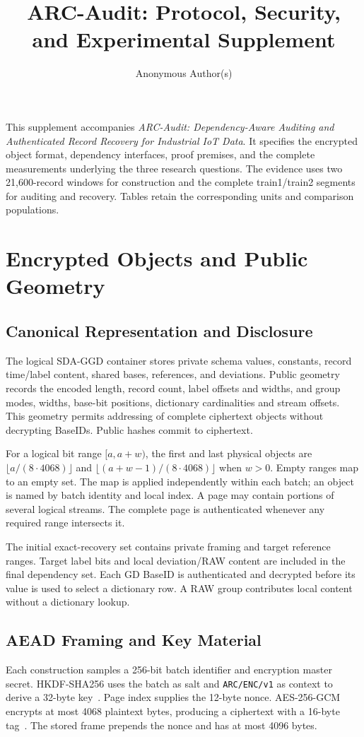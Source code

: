 \documentclass[10pt,journal,onecolumn]{IEEEtran}
\title{ARC-Audit: Protocol, Security, and Experimental Supplement}
\author{Anonymous Author(s)}
\begin{document}
\maketitle
This supplement accompanies \emph{ARC-Audit: Dependency-Aware Auditing
and Authenticated Record Recovery for Industrial IoT Data}. It specifies
the encrypted object format, dependency interfaces, proof premises, and the
complete measurements underlying the three research questions. The evidence
uses two 21,600-record windows for construction and the complete train1/train2
segments for auditing and recovery. Tables retain the corresponding units
and comparison populations.

\section{Encrypted Objects and Public Geometry}\label{sec:protocol}
\subsection{Canonical Representation and Disclosure}
The logical SDA-GGD container stores private schema values, constants,
record time/label content, shared bases, references, and deviations. Public
geometry records the encoded length, record count, label offsets and widths,
and group modes, widths, base-bit positions, dictionary cardinalities and
stream offsets. This geometry permits addressing of complete ciphertext
objects without decrypting BaseIDs. Public hashes commit to ciphertext.

For a logical bit range $[a,a+w)$, the first and last physical objects are
$\lfloor a/(8\cdot4068)\rfloor$ and
$\lfloor(a+w-1)/(8\cdot4068)\rfloor$ when $w>0$. Empty ranges map to an empty
set. The map is applied independently within each batch; an object is named
by batch identity and local index. A page may contain portions of several
logical streams. The complete page is authenticated whenever any required
range intersects it.

The initial exact-recovery set contains private framing and target reference
ranges. Target label bits and local deviation/RAW content are included in
the final dependency set. Each GD BaseID is authenticated and decrypted before
its value is used to select a dictionary row. A RAW group contributes local
content without a dictionary lookup.

\subsection{AEAD Framing and Key Material}
Each construction samples a 256-bit batch identifier and encryption master
secret. HKDF-SHA256 uses the batch as salt and \texttt{ARC/ENC/v1} as context
to derive a 32-byte key~\cite{RFC5869}. Page index supplies the 12-byte nonce.
AES-256-GCM encrypts at most 4068 plaintext bytes, producing a ciphertext
with a 16-byte tag~\cite{RFC5116}. The stored frame prepends the nonce and
has at most 4096 bytes.
\end{document}
